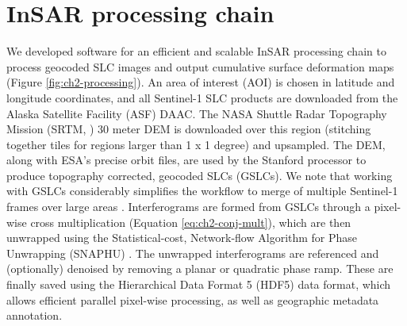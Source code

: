 \section{InSAR processing chain}
\label{sec:ch2-processing}
We developed software for an efficient and scalable InSAR processing chain to process geocoded SLC images and output cumulative surface deformation maps (Figure \ref{fig:ch2-processing}). An area of interest (AOI) is chosen in latitude and longitude coordinates, and all Sentinel-1 SLC products are downloaded from the 
Alaska Satellite Facility (ASF) DAAC. The NASA Shuttle Radar Topography Mission (SRTM, \citep{Nasa2013NasaShuttleRadar}) 30 meter DEM is downloaded over this region (stitching together tiles for regions larger than 1 x 1 degree) and upsampled.
The DEM, along with ESA's precise orbit files, are used by the Stanford processor \cite{Zheng2017PhaseCorrectionSingle, Zebker2017UserFriendlyInsar} to produce topography corrected, geocoded SLCs (GSLCs).
We note that working with GSLCs considerably simplifies the workflow to merge of multiple Sentinel-1 frames over large areas \citep{Zheng2019ImagingCascadiaSlow}.
Interferograms are formed from GSLCs through a pixel-wise cross multiplication (Equation \eqref{eq:ch2-conj-mult}), which are then unwrapped using the Statistical-cost, Network-flow Algorithm for Phase Unwrapping (SNAPHU) \citep{Chen2001TwoDimensionalPhase}. The unwrapped interferograms are referenced and (optionally) denoised by removing a planar or quadratic phase ramp. These are finally saved using the Hierarchical Data Format 5 (HDF5) data format, which allows efficient parallel pixel-wise processing, as well as geographic metadata annotation. 



